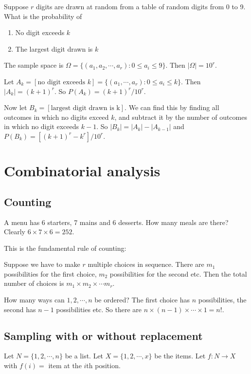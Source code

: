 \documentclass[a4paper]{article}
\begin{document}
\begin{eg}
  Suppose $r$ digits are drawn at random from a table of random digits from 0 to 9. What is the probability of
  \begin{enumerate}
    \item No digit exceeds $k$
    \item The largest digit drawn is $k$
  \end{enumerate}

  The sample space is $\Omega = \{(a_1, a_2, \cdots, a_r): 0 \leq a_i \leq 9\}$. Then $|\Omega| = 10^r$.

  Let $A_k = [\text{no digit exceeds }k] = \{(a_1, \cdots, a_r): 0 \leq a_i \leq k\}$. Then $|A_k| = (k + 1)^r$. So $P(A_k) = (k + 1)^r/10^r$.

  Now let $B_k = [\text{largest digit drawn is k}]$. We can find this by finding all outcomes in which no digits exceed $k$, and subtract it by the number of outcomes in which no digit exceeds $k - 1$. So $|B_k| = |A_k| - |A_{k - 1}|$ and $P(B_k) = [(k + 1)^r - k^r]/10^r$.
\end{eg}

\section{Combinatorial analysis}
\subsection{Counting}
\begin{eg}
  A menu has 6 starters, 7 mains and 6 desserts. How many meals are there? Clearly $6 \times 7 \times 6 = 252$.
\end{eg}
This is the fundamental rule of counting:
\begin{thm}
  Suppose we have to make $r$ multiple choices in sequence. There are $m_1$ possibilities for the first choice, $m_2$ possibilities for the second etc. Then the total number of choices is $m_1\times m_2\times \cdots m_r$.
\end{thm}

\begin{eg}
  How many ways can $1, 2, \cdots, n$ be ordered? The first choice has $n$ possibilities, the second has $n - 1$ possibilities etc. So there are $n\times (n - 1)\times\cdots \times 1 = n!$.
\end{eg}

\subsection{Sampling with or without replacement}
Let $N = \{1, 2, \cdots, n\}$ be a list. Let $X = \{1, 2, \cdots, x\}$ be the items. Let $f: N\to X$ with $f(i) =$ item at the $i$th position.
\end{document}

